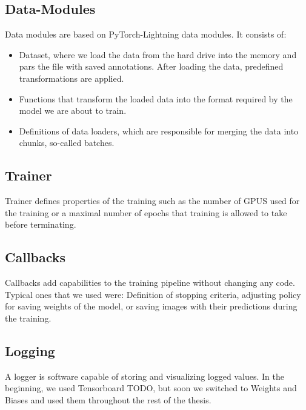\subsection{Data-Modules}
Data modules are based on PyTorch-Lightning data modules. It consists of:
\begin{itemize}
    \item Dataset, where we load the data from the hard drive into the memory and pars the file with saved annotations. After loading the data, predefined transformations are applied.
    \item Functions that transform the loaded data into the format required by the model we are about to train.
    \item Definitions of data loaders, which are responsible for merging the data into chunks, so-called batches.
\end{itemize}
\subsection{Trainer}
Trainer defines properties of the training such as the number of GPUS used for the training or a maximal number of epochs that training is allowed to take before terminating.

\subsection{Callbacks}
Callbacks add capabilities to the training pipeline without changing any code. Typical ones that we used were: Definition of stopping criteria, adjusting policy for saving weights of the model, or saving images with their predictions during the training.

\subsection{Logging}
A logger is software capable of storing and visualizing logged values. In the beginning, we used Tensorboard TODO, but soon we switched to Weights and Biases \cite{wandb} and used them throughout the rest of the thesis.

